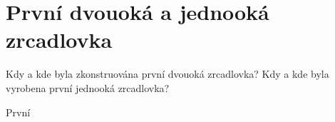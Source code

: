 \section{První dvouoká a jednooká zrcadlovka}
Kdy a kde byla zkonstruována první dvouoká zrcadlovka? Kdy a kde byla vyrobena první jednooká zrcadlovka? 

První 